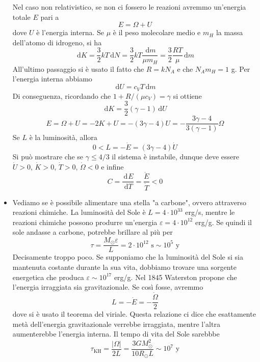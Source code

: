 \documentclass[a4paper,11pt]{article}
\renewcommand{\d}{\mathrm{d}} %
\newcommand{\der}[3][]{\frac{\d ^{#1}#2}{\d {#3}^{#1}}} %
\newcommand{\s}{_\odot}
\renewcommand{\d}{\,\mathrm{d}}
\theoremstyle{theorem}
\theoremstyle{definition}
\begin{document}
\begin{itemize}
\begin{itemize}
		\end{itemize}
		Nel caso non relativistico, se non ci fossero le reazioni avremmo un'energia totale $E$ pari a
		\[E=\Omega+U\]
		dove $U$ è l'energia interna. Se $\mu$ è il peso molecolare medio e $m_H$ la massa dell'atomo di idrogeno, si ha
		\[\d K=\frac{3}{2}kT\d N=\frac{3}{2}kT\frac{\d m}{\mu m_H}=\frac{3}{2}\frac{RT}{\mu}\d m\]
		All'ultimo passaggio si è usato il fatto che $R=k N_A$ e che $N_Am_H=1$ g. Per l'energia interna abbiamo
		\[\d U=c_VT\d m\]
		Di conseguenza, ricordando che $1+R/(\mu c_V)=\gamma$ si ottiene
		\[\d K=\frac{3}{2}(\gamma -1)\d U\]
		\[E=\Omega+U=-2K+U=-(3\gamma-4)U=-\frac{3\gamma-4}{3(\gamma-1)}\Omega\]
		Se $L$ è la luminosità, allora
		\[0<L=-\dot{E}=(3\gamma-4)\dot{U}\]
		Si può mostrare che se $\gamma\leq 4/3$ il sistema è instabile, dunque deve essere $\dot{U}>0$, $\dot{K}>0$, $\dot{T}>0$, $\dot{\Omega}<0$ e infine
		\[C=\der{E}{T}=\frac{\dot{E}}{\dot{T}}<0\]
		\item Vediamo se è possibile alimentare una stella "a carbone", ovvero attraverso reazioni chimiche. La luminosità del Sole è $L=4\cdot10^{33}$ erg/s, mentre le reazioni chimiche possono produrre un'energia $\varepsilon=4\cdot10^{12}$ erg/g. Se quindi il sole andasse a carbone, potrebbe brillare al più per
		\[\tau=\frac{M\s\varepsilon}{L}=2\cdot10^{12}\textrm{ s}\sim10^{5}\textrm{ y}\]
		Decisamente troppo poco. Se supponiamo che la luminosità del Sole si sia mantenuta costante durante la sua vita, dobbiamo trovare una sorgente energetica che produca $\varepsilon\sim10^{17}$ erg/g. Nel 1845 Waterston propone che l'energia irraggiata sia gravitazionale. Se così fosse, avremmo
		\[L=-\dot{E}=-\frac{\dot{\Omega}}{2}\]
		dove si è usato il teorema del viriale. Questa relazione ci dice che esattamente metà dell'energia gravitazionale verrebbe irraggiata, mentre l'altra aumenterebbe l'energia interna. Il tempo di vita del Sole sarebbbe
		\[\tau_{\textrm{KH}}=\frac{|\Omega|}{2L}=\frac{3GM\s^2}{10R\s L}\sim10^{7}\textrm{ y}\]

\end{itemize}
\end{document}
